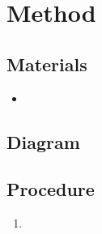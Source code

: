 
\section{Method}

\subsection{Materials}
\begin{itemize}
\item
\end{itemize}

\subsection{Diagram}


\subsection{Procedure}
\begin{enumerate}
\item
\end{enumerate}

